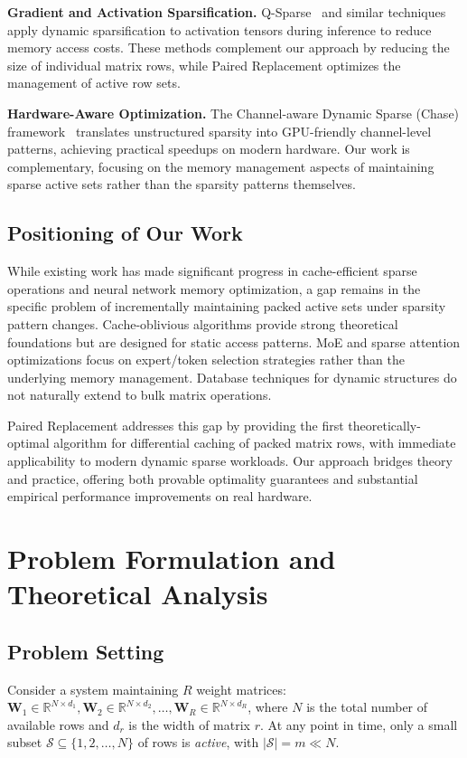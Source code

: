\documentclass{article}
\numberwithin{equation}{section}
\theoremstyle{plain}
\theoremstyle{definition}
\theoremstyle{remark}
\begin{document}
\textbf{Gradient and Activation Sparsification.} Q-Sparse~\cite{wang2024q} and similar techniques apply dynamic sparsification to activation tensors during inference to reduce memory access costs. These methods complement our approach by reducing the size of individual matrix rows, while Paired Replacement optimizes the management of active row sets.

\textbf{Hardware-Aware Optimization.} The Channel-aware Dynamic Sparse (Chase) framework~\cite{yin2024chase} translates unstructured sparsity into GPU-friendly channel-level patterns, achieving practical speedups on modern hardware. Our work is complementary, focusing on the memory management aspects of maintaining sparse active sets rather than the sparsity patterns themselves.

\subsection{Positioning of Our Work}

While existing work has made significant progress in cache-efficient sparse operations and neural network memory optimization, a gap remains in the specific problem of incrementally maintaining packed active sets under sparsity pattern changes. Cache-oblivious algorithms provide strong theoretical foundations but are designed for static access patterns. MoE and sparse attention optimizations focus on expert/token selection strategies rather than the underlying memory management. Database techniques for dynamic structures do not naturally extend to bulk matrix operations.

Paired Replacement addresses this gap by providing the first theoretically-optimal algorithm for differential caching of packed matrix rows, with immediate applicability to modern dynamic sparse workloads. Our approach bridges theory and practice, offering both provable optimality guarantees and substantial empirical performance improvements on real hardware.

\section{Problem Formulation and Theoretical Analysis} \label{sec:problem}

\subsection{Problem Setting}

Consider a system maintaining $R$ weight matrices: $\mathbf{W}_1 \in \mathbb{R}^{N \times d_1}, \mathbf{W}_2 \in \mathbb{R}^{N \times d_2}, \ldots, \mathbf{W}_R \in \mathbb{R}^{N \times d_R}$, where $N$ is the total number of available rows and $d_r$ is the width of matrix $r$. At any point in time, only a small subset $\mathcal{S} \subseteq \{1, 2, \ldots, N\}$ of rows is \emph{active}, with $|\mathcal{S}| = m \ll N$.
\end{document}
